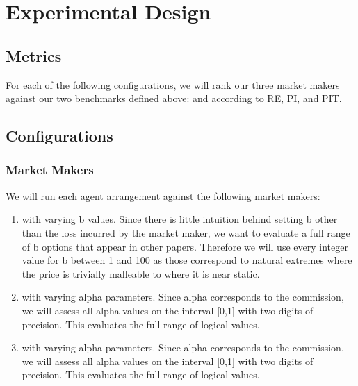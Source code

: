 \section{Experimental Design}
\subsection{Metrics}
For each of the following configurations, we will rank our three market makers against our two benchmarks defined above:  and  according to RE, PI, and PIT.

\subsection{Configurations}
\subsubsection{Market Makers}
We will run each agent arrangement against the following market makers:
\begin{enumerate}
\item {} with varying b values. Since there is little intuition behind setting b other than the loss incurred by the market maker, we want to evaluate a full range of b options that appear in other papers. Therefore we will use every integer value for b between 1 and 100 as those correspond to natural extremes where the price is trivially malleable to where it is near static.

\item {} with varying alpha parameters. Since alpha corresponds to the commission, we will assess all alpha values on the interval [0,1] with two digits of precision. This evaluates the full range of logical values.

\item {} with varying alpha parameters. Since alpha corresponds to the commission, we will assess all alpha values on the interval [0,1] with two digits of precision. This evaluates the full range of logical values.
\end{enumerate}

